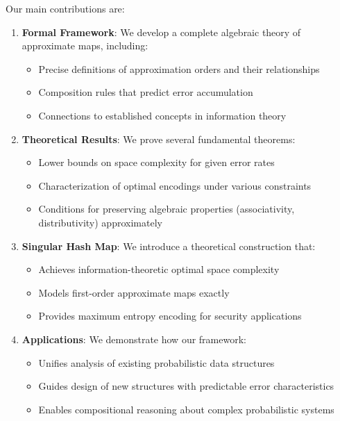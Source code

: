 Our main contributions are:

\begin{enumerate}
    \item \textbf{Formal Framework}: We develop a complete algebraic theory of approximate maps, including:
    \begin{itemize}
        \item Precise definitions of approximation orders and their relationships
        \item Composition rules that predict error accumulation
        \item Connections to established concepts in information theory
    \end{itemize}

    \item \textbf{Theoretical Results}: We prove several fundamental theorems:
    \begin{itemize}
        \item Lower bounds on space complexity for given error rates
        \item Characterization of optimal encodings under various constraints
        \item Conditions for preserving algebraic properties (associativity, distributivity) approximately
    \end{itemize}

    \item \textbf{Singular Hash Map}: We introduce a theoretical construction that:
    \begin{itemize}
        \item Achieves information-theoretic optimal space complexity
        \item Models first-order approximate maps exactly
        \item Provides maximum entropy encoding for security applications
    \end{itemize}

    \item \textbf{Applications}: We demonstrate how our framework:
    \begin{itemize}
        \item Unifies analysis of existing probabilistic data structures
        \item Guides design of new structures with predictable error characteristics
        \item Enables compositional reasoning about complex probabilistic systems
    \end{itemize}
\end{enumerate}

